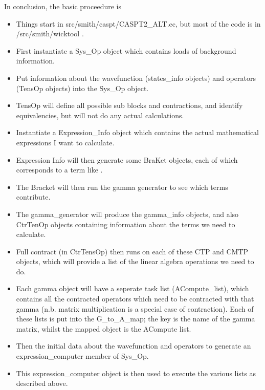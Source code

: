 \documentclass[12pt]{article}
\begin{document}
In conclusion, the basic proceedure is 
\begin{itemize}
\item Things start in src/smith/caspt/CASPT2\_ALT.cc, but most of the code is in /src/smith/wicktool .
\item First instantiate a Sys\_Op object which contains loads of background information. 
\item Put information about the wavefunction (states\_info objects) and  operators (TensOp objects) into the Sys\_Op object.
\item TensOp will define all possible sub blocks and contractions, and identify equivalencies, but will not do any actual calculations.
\item Instantiate a Expression\_Info object which contains the actual mathematical expressions I want to calculate.
\item Expression Info will then generate some  BraKet objects, each of which corresponds to a term like . 
\item The Bracket will then run the gamma generator to see which terms contribute.
\item The gamma\_generator will produce the gamma\_info objects, and also CtrTenOp objects containing information about the terms
we need to calculate.
\item Full contract (in CtrTensOp) then runs on each of these CTP and CMTP objects, which will provide a list of the linear algebra operations
we need to do.
\item Each gamma object will have a seperate task list (ACompute\_list), which contains all the contracted operators which need 
to be contracted with that gamma (n.b. matrix multiplication is a special case of contraction). Each of these lists is put into the G\_to\_A\_map;
the key is the name of the gamma matrix, whilst the mapped object is the ACompute list.
\item Then the initial data about the wavefunction and operators to generate an expression\_computer member of Sys\_Op. 
\item This expression\_computer object is then used to execute the various lists as described above.\\
\end{itemize}
\end{document}

